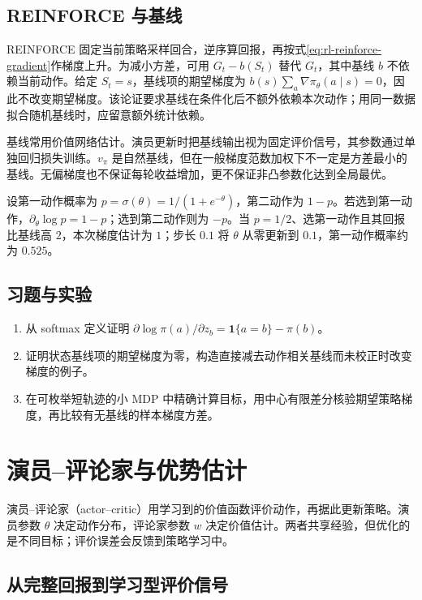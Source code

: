 \documentclass[UTF8,12pt,a4paper,fontset=fandol]{ctexbook}
\begin{document}
\section{REINFORCE 与基线}

REINFORCE 固定当前策略采样回合，逆序算回报，再按式\eqref{eq:rl-reinforce-gradient}作梯度上升。为减小方差，可用 $G_t-b(S_t)$ 替代 $G_t$，其中基线 $b$ 不依赖当前动作。给定 $S_t=s$，基线项的期望梯度为 $b(s)\sum_a\nabla\pi_\theta(a\mid s)=0$，因此不改变期望梯度。该论证要求基线在条件化后不额外依赖本次动作；用同一数据拟合随机基线时，应留意额外统计依赖。

基线常用价值网络估计。演员更新时把基线输出视为固定评价信号，其参数通过单独回归损失训练。$v_\pi$ 是自然基线，但在一般梯度范数加权下不一定是方差最小的基线。无偏梯度也不保证每轮收益增加，更不保证非凸参数化达到全局最优。

\begin{example}[双动作策略的一次更新]
设第一动作概率为 $p=\sigma(\theta)=1/(1+e^{-\theta})$，第二动作为 $1-p$。若选到第一动作，$\partial_\theta\log p=1-p$；选到第二动作则为 $-p$。当 $p=1/2$、选第一动作且其回报比基线高 $2$，本次梯度估计为 $1$；步长 $0.1$ 将 $\theta$ 从零更新到 $0.1$，第一动作概率约为 $0.525$。
\end{example}

\section{习题与实验}
\begin{enumerate}
\item 从 softmax 定义证明 $\partial\log\pi(a)/\partial z_b=\mathbf1\{a=b\}-\pi(b)$。
\item 证明状态基线项的期望梯度为零，构造直接减去动作相关基线而未校正时改变梯度的例子。
\item 在可枚举短轨迹的小 MDP 中精确计算目标，用中心有限差分核验期望策略梯度，再比较有无基线的样本梯度方差。
\end{enumerate}

\chapter{演员--评论家与优势估计}
\label{ch:rl-actor-critic}

演员--评论家（actor--critic）用学习到的价值函数评价动作，再据此更新策略。演员参数 $\theta$ 决定动作分布，评论家参数 $w$ 决定价值估计。两者共享经验，但优化的是不同目标；评价误差会反馈到策略学习中。

\section{从完整回报到学习型评价信号}
\end{document}
